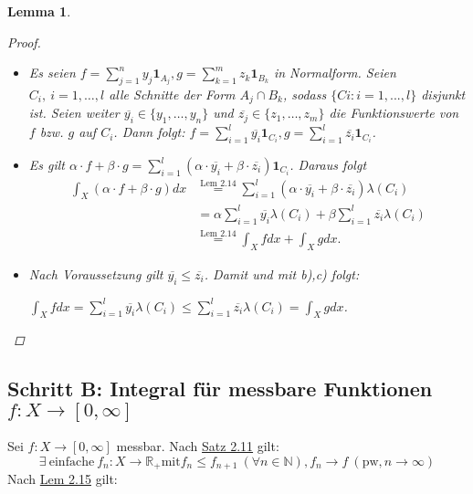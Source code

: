\documentclass[a4paper]{scrreprt}
\newcommand{\doubleOne}{\textbf{1}}
\newcommand{\R}{\mathbb{R}}
\newcommand{\N}{\mathbb{N}}
\newcommand{\toInf}{\rightarrow \infty}
\newcommand{\jlabel}[1]{\label{j_#1}}
\newcommand{\jshortlink}[1]{\jhyperref{#1}{\text{#1}}}
\newcommand{\jhyperref}[2]{\hyperref[j_#1]{#2}}
\newcommand{\jlink}[1]{\jhyperref{#1}{#1}}
\theoremstyle{plain}
\newtheorem{lem}[thm]{Lemma}
\theoremstyle{definition}
\begin{document}
{{{\begin{lem}
\begin{proof}
\begin{itemize}
            \item[b),c):]
                Es seien $f = \sum_{j=1}^n y_j \doubleOne_{A_j}, g = \sum_{k=1}^m z_k \doubleOne_{B_k}$ in Normalform.
                Seien $C_i,\ i = 1,\dots,l$ alle Schnitte der Form $A_j \cap B_k$, sodass $\{Ci : i = 1,...,l\}$ disjunkt ist.
                Seien weiter $\overline{y_i} \in \{y_1, \dots, y_n\}$ und $\overline{z_j} \in \{z_1, \dots, z_m\}$ die Funktionswerte von $f$ bzw. $g$ auf $C_i$. Dann folgt: $f = \sum_{i=1}^l \overline{y_i} \doubleOne_{C_i}, g = \sum_{i=1}^l \overline{z_i} \doubleOne_{C_i}$.
                
            \item[b):]
                Es gilt $\alpha\cdot f + \beta\cdot g = \sum_{i=1}^l (\alpha\cdot \overline{y_i} + \beta\cdot \overline{z_i})\doubleOne_{C_i}$.
                Daraus folgt
                \begin{displaymath}
                    \begin{split}
                        \int_X (\alpha\cdot f + \beta\cdot g)dx &\overset{\jshortlink{Lem 2.14}}{=} \sum_{i=1}^l(\alpha\cdot \overline{y_i} + \beta\cdot \overline{z_i})\lambda(C_i)\\
                        &= \alpha \sum_{i=1}^l \overline{y_i} \lambda(C_i) + \beta \sum_{i=1}^l \overline{z_i} \lambda(C_i)\\
                        &\overset{\jshortlink{Lem 2.14}}{=} \int_X f dx + \int_X g dx.
                    \end{split}
                \end{displaymath}
            \item[c):]
                Nach Voraussetzung gilt $\overline{y_i} \le \overline{z_i}$. Damit und mit b),c) folgt:
                
                $\int_X f dx = \sum_{i=1}^l \overline{y_i} \lambda(C_i) \le \sum_{i=1}^l \overline{z_i} \lambda(C_i) = \int_X g dx$.
        \end{itemize}
    \end{proof}
\end{lem}

\subsection*{Schritt B: Integral für messbare Funktionen $f: X \rightarrow [0, \infty]$}

Sei $f: X \rightarrow [0, \infty]$ messbar. Nach \jlink{Satz 2.11} gilt:
\jlabel{(2.2)}
\begin{equation}
    \exists \ \text{einfache} \ f_n: X \rightarrow \R_+ \text{mit} f_n \le f_{n+1} \ (\forall n \in \N), f_n \rightarrow f \  (\text{pw}, n \toInf)
\end{equation} 
Nach \jlink{Lem 2.15} gilt:

}}}
\end{document}
